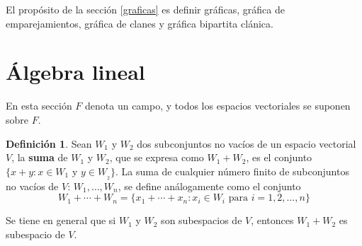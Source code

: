 \documentclass[12pt]{book}
\newtheorem{theorem}{Teorema}[section]
\theoremstyle{definition}
\newtheorem{definition}[theorem]{Definición}
\newcounter{in}
\newcounter{ini}
\begin{document}
El propósito de la sección \ref{graficas} es definir gráficas,
gráfica de emparejamientos, gráfica de clanes y gráfica bipartita
clánica.


\section{Álgebra lineal}
\label{esp-vec}

En esta sección $F$ denota un campo, y todos los espacios vectoriales
se suponen sobre $F$.


\begin{definition}
  Sean $W_{1}$ y $W_{2}$ dos subconjuntos no vacíos de un espacio
  vectorial $V$, la \textbf{suma} de $W_{1}$ y $W_{2}$, que se
  expresa como $W_{1}+W_{2}$, es el conjunto $\{x+y:x\in W_{1}$ y $y\in
  W_{_2}\}$. La suma de cualquier número finito de subconjuntos no
  vacíos de $V$: $W_{1},\ldots,W_{n}$, se define análogamente como el
  conjunto
  $$W_{1}+\cdots+W_{n}=\{x_{1}+\cdots+x_{n}: x_{i}\in W_{i} \mbox{ para }i=1,2,\ldots,n\}$$
\end{definition}

Se tiene en general que si $W_{1}$ y $W_{2}$ son subespacios de $V$,
entonces $W_{1}+W_{2}$ es subespacio de $V$.
\end{document}
